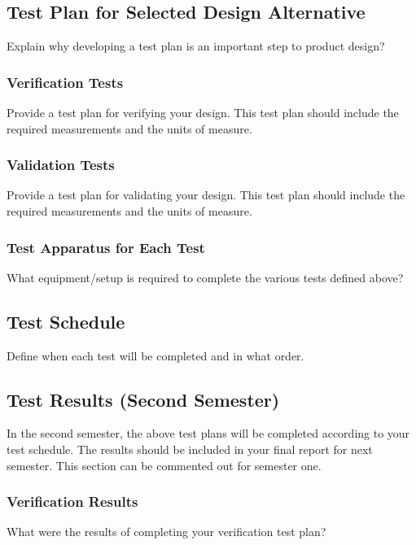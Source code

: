 \documentclass{ipfwpaper}
\begin{document}
\subsection{Test Plan for Selected Design Alternative}
Explain why developing a test plan is an important step to product design? 



\subsubsection{Verification Tests}
Provide a test plan for verifying your design.
This test plan should include the required measurements and the units of measure.

\subsubsection{Validation Tests}
Provide a test plan for validating your design.
This test plan should include the required measurements and the units of measure.

\subsubsection{Test Apparatus for Each Test}
What equipment/setup is required to complete the various tests defined above? 


\subsection{Test Schedule}
Define when each test will be completed and in what order.


\subsection{Test Results (Second Semester)}
In the second semester, the above test plans will be completed according to your test schedule. The results should be included in your final report for next semester. This section can be commented out for semester one. 
\subsubsection{Verification Results}
What were the results of completing your verification test plan?
\end{document}
